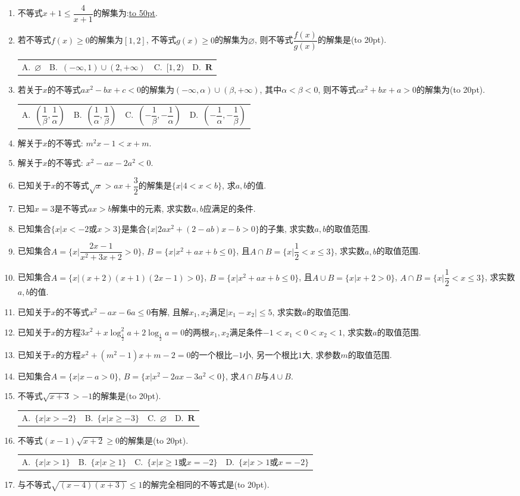 \documentclass[10pt,a4paper]{article}
\newcommand{\blank}[1]{\underline{\hbox to #1pt{}}}
\newcommand{\bracket}[1]{(\hbox to #1pt{})}
\newcommand{\fourch}[4]{\par\begin{tabular}{p{.23\textwidth}p{.23\textwidth}p{.23\textwidth}p{.23\textwidth}}
A.~#1 &B.~#2& C.~#3& D.~#4
\end{tabular}}
\begin{document}
\begin{enumerate}[1.]
\item 不等式$x+1\le \dfrac 4{x+1}$的解集为:\blank{50}.
\item 若不等式$f(x)\ge 0$的解集为$[1,2]$, 不等式$g(x)\ge 0$的解集为$\varnothing$, 则不等式$\dfrac{f(x)}{g(x)}$的解集是\bracket{20}.
\fourch{$\varnothing$}{$(-\infty ,1)\cup (2,+\infty)$}{$[1,2)$}{$\mathbf{R}$}
\item 若关于$x$的不等式$ax^2-bx+c<0$的解集为$(-\infty ,\alpha)\cup (\beta ,+\infty)$, 其中$\alpha <\beta <0$, 则不等式$cx^2+bx+a>0$的解集为\bracket{20}.
\fourch{$(\dfrac 1{\beta},\dfrac 1{\alpha})$}{$(\dfrac 1{\alpha},\dfrac 1{\beta})$}{$(-\dfrac 1{\beta},-\dfrac 1{\alpha})$}{$(-\dfrac 1{\alpha},-\dfrac 1{\beta})$}
\item 解关于$x$的不等式: $m^2x-1<x+m$.
\item 解关于$x$的不等式: $x^2-ax-2a^2<0$.
\item 已知关于$x$的不等式$\sqrt x>ax+\dfrac 32$的解集是$\{x|4<x<b\}$, 求$a,b$的值.
\item 已知$x=3$是不等式$ax>b$解集中的元素, 求实数$a,b$应满足的条件.
\item 已知集合$\{x|x<-2\text{或}x>3\}$是集合$\{x|2ax^2+(2-ab)x-b>0\}$的子集, 求实数$a,b$的取值范围.
\item 已知集合$A=\{x|\dfrac{2x-1}{x^2+3x+2}>0\}$, $B=\{x|x^2+ax+b\le 0\}$, 且$A\cap B=\{x|\dfrac 12<x\le 3\}$, 求实数$a,b$的取值范围.
\item 已知集合$A=\{x|(x+2)(x+1)(2x-1)>0\}$, $B=\{x|x^2+ax+b\le 0\}$, 且$A\cup B=\{x|x+2 >0\}$, $A\cap B=\{x|\dfrac 12<x\le 3\}$, 求实数$a,b$的值.
\item 已知关于$x$的不等式$x^2-ax-6a\le 0$有解, 且解$x_1,x_2$满足$|x_1-x_2|\le 5$, 求实数$a$的取值范围.
\item 已知关于$x$的方程$3x^2+x\log_{\frac 12}^2a+2\log_{\frac 12}a=0$的两根$x_1,x_2$满足条件$-1<x_1<0<x_2<1$, 求实数$a$的取值范围.
\item 已知关于$x$的方程$x^2+(m^2-1)x+m-2=0$的一个根比$-1$小, 另一个根比$1$大, 求参数$m$的取值范围.
\item 已知集合$A=\{x|x-a>0\}$, $B=\{x|x^2-2ax-3a^2<0\}$, 求$A\cap B$与$A\cup B$.
\item 不等式$\sqrt{x+3}>-1$的解集是\bracket{20}.
\fourch{$\{x|x>-2\}$}{$\{x|x\ge -3\}$}{$\varnothing$}{$\mathbf{R}$}
\item 不等式$(x-1)\sqrt{x+2}\ge 0$的解集是\bracket{20}.
\fourch{$\{x|x>1\}$}{$\{x|x\ge 1\}$}{$\{x|x\ge 1\text{或}x=-2\}$}{$\{x|x>1\text{或}x=-2\}$}
\item 与不等式$\sqrt{(x-4)(x+3)}\le 1$的解完全相同的不等式是\bracket{20}.

\end{enumerate}
\end{document}
